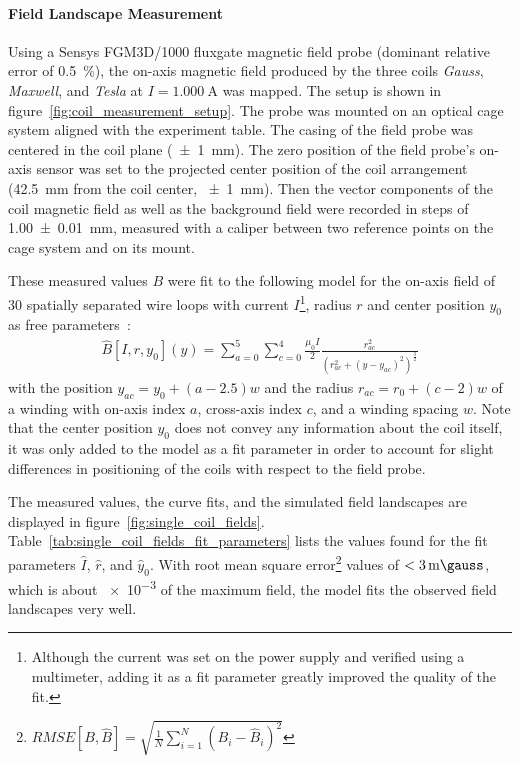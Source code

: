 \paragraph{Field Landscape Measurement}
Using a Sensys FGM3D/1000 fluxgate magnetic field probe (dominant relative error of \SI{0.5}{\percent}), the on-axis magnetic field produced by the three coils \textit{Gauss}, \textit{Maxwell}, and \textit{Tesla} at $I = \SI{1.000}{\ampere}$ was mapped. The setup is shown in figure~\ref{fig:coil_measurement_setup}. The probe was mounted on an optical cage system aligned with the experiment table. The casing of the field probe was centered in the coil plane (\SI[]{+-1}{\milli\meter}). The zero position of the field probe's on-axis sensor was set to the projected center position of the coil arrangement (\SI[]{42.5}{\milli\meter} from the coil center, \SI[]{+-1}{\milli\meter}). Then the vector components of the coil magnetic field as well as the background field were recorded in steps of \SI[]{1.00(1)}{\milli\meter}, measured with a caliper between two reference points on the cage system and on its mount.

These measured values $B$ were fit to the following model for the on-axis field of \SI{30}{} spatially separated wire loops with current $I$\footnote{Although the current was set on the power supply and verified using a multimeter, adding it as a fit parameter greatly improved the quality of the fit.}, radius $r$ and center position $y_0$ as free parameters~\cite{demtroder_statische_2013}:
\begin{align}\label{eq:on_axis_field_model}
    \hat B[I, r, y_0](y) = \sum\limits_{a = 0}^5 \sum\limits_{c = 0}^4 \frac{\mu_0 I}{2} \frac{r_{ac}^2}{\left(r_{ac}^2 + (y - y_{ac})^2\right)^\frac{3}{2}}
\end{align}
with the position $y_{ac} = y_0 + (a - 2.5) w$ and the radius $r_{ac} = r_0 + (c-2)w$ of a winding with on-axis index $a$, cross-axis index $c$, and a winding spacing $w$. Note that the center position $y_0$ does not convey any information about the coil itself, it was only added to the model as a fit parameter in order to account for slight differences in positioning of the coils with respect to the field probe.

The measured values, the curve fits, and the simulated field landscapes are displayed in figure~\ref{fig:single_coil_fields}. Table~\ref{tab:single_coil_fields_fit_parameters} lists the values found for the fit parameters $\hat I$, $\hat r$, and $\hat y_0$. With root mean square error\footnote{$RMSE[B, \hat B] = \sqrt{\frac{1}{N}\sum_{i = 1}^N (B_i-\hat B_i)^2}$} values of $<\SI{3}{\milli\gauss}$, which is about \SI{e-3}{} of the maximum field, the model fits the observed field landscapes very well.


